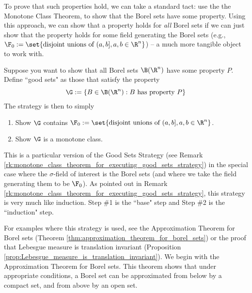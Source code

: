 \documentclass{article} %
\begin{document}
To prove that such properties hold, we can take a standard tact: use the the Monotone Class Theorem,  to show that the Borel sets have some property.  Using this approach, we can show that a property holds for \textit{all} Borel sets if we can just show that the property holds for some field generating the Borel sets (e.g., $\F_0 := \set{\text{disjoint unions of } (a,b], a,b \in \R^n }$) -- a much more tangible object to work with.


\begin{remark}{}
Suppose you want to show that all Borel sets $\B(\R^n)$ have some property $P$.  Define ``good sets" as those that satisfy the property
\[ \G := \{ B \in \B(\R^n) : B \text{ has property } P \} \]
The strategy is then to simply
\begin{enumerate}
\item Show $\G$ contains $\F_0 := \set{\text{disjoint unions of } (a,b], a,b \in \R^n }$.
\item Show $\G$ is a monotone class.  
\end{enumerate}	 
\label{rk:monotone_class_theorem_for_executing_good_sets_strategy_with_borel_sets}
\end{remark}


This is a particular version of the Good Sets Strategy (see Remark \ref{rk:monotone_class_theorem_for_executing_good_sets_strategy}) in the special case where the $\sigma$-field of interest is the Borel sets (and where we take the field generating them to be $\F_0$).  As pointed out in Remark \ref{rk:monotone_class_theorem_for_executing_good_sets_strategy}, this strategy is very much like induction.  Step \#1 is the ``base" step and Step \#2 is the ``induction" step.

For examples where this strategy is used, see the  Approximation Theorem for Borel sets (Theorem \ref{thm:approximation_theorem_for_borel_sets}) or the proof that Lebesgue measure is translation invariant (Proposition \ref{prop:Lebesgue_measure_is_translation_invariant}). We begin with the Approximation Theorem for Borel sets.  This theorem shows that under appropriate conditions, a Borel set can be approximated from below by a compact set, and from above by an open set. 
\end{document}
